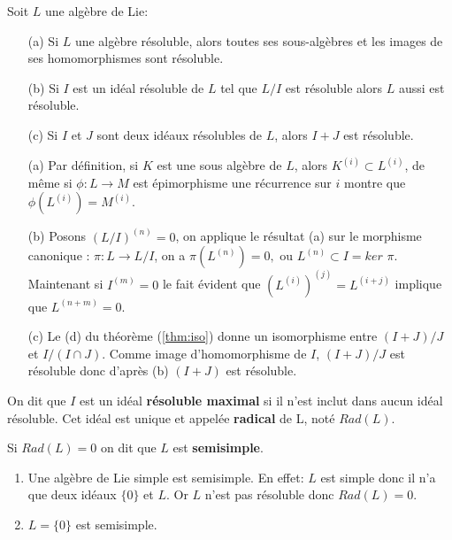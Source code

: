 \documentclass[a4paper,openany,12pt]{report}
\theoremstyle{break}
{\theorembodyfont{\upshape}
\newtheorem*{rmq}{Remarque :}
\newtheorem*{prv}{Preuve :}
\newtheorem*{ex}{Exemples :}
\newtheorem*{exe}{Exemple : }
\newtheorem*{nota}{Notation :}
\newtheorem*{dem}{D\'emonstration :}}
\begin{document}
\begin{prop}\label{prop:solv}
Soit $L$ une algèbre de Lie: 
\begin{itemize}
\item[(a)] Si $L$ une algèbre résoluble, alors toutes ses sous-algèbres et les images de ses homomorphismes sont résoluble.
\item[(b)] Si $I$ est un idéal résoluble de $L$ tel que $L/I$ est résoluble alors $L$ aussi est résoluble.
\item[(c)] Si $I$ et $J$ sont deux idéaux résolubles de $L$, alors $I+J$ est résoluble.
\end{itemize}
\end{prop}

\begin{prv}
\begin{enumerate}
\item[(a)] Par définition, si $K$ est une sous algèbre de $L$, alors $K^{(i)} \subset L^{(i)}$, de même si $\phi: L \rightarrow M$ est épimorphisme une récurrence sur $i$ montre que $\phi\left(L^{(i)}\right)=M^{(i)}$.

\item[(b)] Posons $(L / I)^{(n)}=0$, on applique le résultat (a) sur le morphisme canonique : $\pi: L \rightarrow L / I$, on a  $\pi\left(L^{(n)}\right)=0,$ ou  $L^{(n)} \subset I= ker$ $\pi$. Maintenant si  $I^{(m)}=0$ le fait évident que $\left(L^{(i)}\right)^{(j)}=L^{(i+j)}$ implique que  $L^{(n+m)}=0$. 

\item[(c)] Le (d) du théorème (\ref{thm:iso}) donne un isomorphisme entre $(I+J) / J$ et $I /(I \cap J)$. Comme image d'homomorphisme de $I$, $(I+J) / J$  est résoluble donc d'après (b)  $(I+J)$ est résoluble.
\end{enumerate}
\end{prv}

\begin{df}
\quad On dit que $I$ est un idéal \textbf{résoluble maximal} si il n'est inclut dans aucun idéal résoluble. Cet idéal est unique et appelée \textbf{radical} de L, noté $Rad(L)$.
\end{df}

\begin{df}
\quad Si $Rad (L) = 0$ on dit que $L$ est \textbf{semisimple}.
\end{df}

\begin{ex}
\begin{enumerate}
\item Une algèbre de Lie simple est semisimple.
En effet: $L$ est simple donc il n'a que deux idéaux $\{ 0 \}$ et $L$. Or $L$ n'est pas résoluble donc $Rad (L)= {0}$.

\item $L= \{0\}$ est semisimple.
\end{enumerate}
\end{ex}
\end{document}
